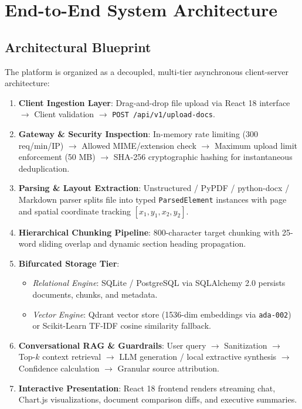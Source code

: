 \documentclass[11pt,a4paper]{article}
\begin{document}
\section{End-to-End System Architecture}

\subsection{Architectural Blueprint}
The platform is organized as a decoupled, multi-tier asynchronous client-server architecture:

\begin{tcolorbox}[colback=codebg,colframe=accentpurple,title=\textbf{End-to-End Processing Pipeline Flow}]
\begin{enumerate}[leftmargin=*]
    \item \textbf{Client Ingestion Layer}: Drag-and-drop file upload via React 18 interface $\rightarrow$ Client validation $\rightarrow$ \texttt{POST /api/v1/upload-docs}.
    \item \textbf{Gateway \& Security Inspection}: In-memory rate limiting (300 req/min/IP) $\rightarrow$ Allowed MIME/extension check $\rightarrow$ Maximum upload limit enforcement (50 MB) $\rightarrow$ SHA-256 cryptographic hashing for instantaneous deduplication.
    \item \textbf{Parsing \& Layout Extraction}: Unstructured / PyPDF / python-docx / Markdown parser splits file into typed \texttt{ParsedElement} instances with page and spatial coordinate tracking $[x_1, y_1, x_2, y_2]$.
    \item \textbf{Hierarchical Chunking Pipeline}: 800-character target chunking with 25-word sliding overlap and dynamic section heading propagation.
    \item \textbf{Bifurcated Storage Tier}:
    \begin{itemize}
        \item \textit{Relational Engine}: SQLite / PostgreSQL via SQLAlchemy 2.0 persists documents, chunks, and metadata.
        \item \textit{Vector Engine}: Qdrant vector store (1536-dim embeddings via \texttt{ada-002}) or Scikit-Learn TF-IDF cosine similarity fallback.
    \end{itemize}
    \item \textbf{Conversational RAG \& Guardrails}: User query $\rightarrow$ Sanitization $\rightarrow$ Top-$k$ context retrieval $\rightarrow$ LLM generation / local extractive synthesis $\rightarrow$ Confidence calculation $\rightarrow$ Granular source attribution.
    \item \textbf{Interactive Presentation}: React 18 frontend renders streaming chat, Chart.js visualizations, document comparison diffs, and executive summaries.
\end{enumerate}
\end{tcolorbox}
\end{document}
